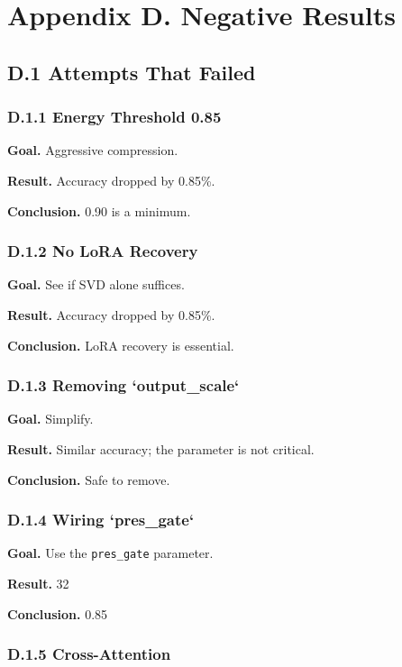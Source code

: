 \section{Appendix D. Negative Results}

\subsection{D.1 Attempts That Failed}

\subsubsection{D.1.1 Energy Threshold 0.85}

\textbf{Goal.} Aggressive compression.

\textbf{Result.} Accuracy dropped by 0.85\%.

\textbf{Conclusion.} 0.90 is a minimum.

\subsubsection{D.1.2 No LoRA Recovery}

\textbf{Goal.} See if SVD alone suffices.

\textbf{Result.} Accuracy dropped by 0.85\%.

\textbf{Conclusion.} LoRA recovery is essential.

\subsubsection{D.1.3 Removing `output\_scale`}

\textbf{Goal.} Simplify.

\textbf{Result.} Similar accuracy; the parameter is not critical.

\textbf{Conclusion.} Safe to remove.

\subsubsection{D.1.4 Wiring `pres\_gate`}

\textbf{Goal.} Use the \texttt{pres\_gate} parameter.

\textbf{Result.} 32

\textbf{Conclusion.} 0.85

\subsubsection{D.1.5 Cross-Attention}

